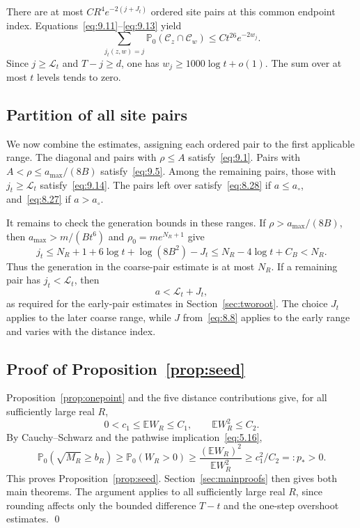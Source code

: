 \documentclass[11pt,letterpaper,reqno]{amsart}
\numberwithin{equation}{section}
\theoremstyle{remark}
\begin{document}
There are at most $CR^4e^{-2(j+J_t)}$ ordered site pairs at this common endpoint index. Equations~\eqref{eq:9.11}--\eqref{eq:9.13} yield
\begin{equation}\label{eq:9.14}
\sum_{j_t(z,w)=j}\mathbb P_0(\mathcal C_z\cap\mathcal C_w)
\le Ct^{26}e^{-2w_j}.
\end{equation}
Since $j\ge\mathcal L_t$ and $T-j\ge d$, one has
$w_j\ge1000\log t+o(1)$. The sum over at most $t$ levels tends to zero.

\subsection{Partition of all site pairs}\label{sec:partition}
We now combine the estimates, assigning each ordered pair to the first applicable range. The diagonal and pairs with $\rho\le A$ satisfy~\eqref{eq:9.1}. Pairs with $A<\rho\le a_{\max}/(8B)$ satisfy~\eqref{eq:9.5}. Among the remaining pairs, those with $j_t\ge\mathcal L_t$ satisfy~\eqref{eq:9.14}. The pairs left over satisfy~\eqref{eq:8.28} if $a\le a_\circ$, and~\eqref{eq:8.27} if $a>a_\circ$.

It remains to check the generation bounds in these ranges. If $\rho>a_{\max}/(8B)$, then $a_{\max}>m/(Bt^6)$ and $\rho_0=me^{N_R+1}$ give
\begin{equation}\label{eq:9.15}
j_t\le N_R+1+6\log t+\log(8B^2)-J_t
\le N_R-4\log t+C_B<N_R.
\end{equation}
Thus the generation in the coarse-pair estimate is at most $N_R$. If a remaining pair has $j_t<\mathcal L_t$, then
\begin{equation}\label{eq:9.16}
a<\mathcal L_t+J_t,
\end{equation}
as required for the early-pair estimates in Section~\ref{sec:tworoot}. The choice $J_t$ applies to the later coarse range, while $J$ from~\eqref{eq:8.8} applies to the early range and varies with the distance index.

\subsection{Proof of Proposition~\ref{prop:seed}}\label{sec:seedcompletion}
Proposition~\ref{prop:onepoint} and the five distance contributions give, for all sufficiently large real $R$,
\begin{equation}\label{eq:9.17}
0<c_1\le\mathbb EW_R\le C_1,\qquad
\mathbb EW_R^2\le C_2.
\end{equation}
By Cauchy--Schwarz and the pathwise implication~\eqref{eq:5.16},
\begin{equation}\label{eq:9.18}
\mathbb P_0(\sqrt{M_R}\ge b_R)
\ge\mathbb P_0(W_R>0)
\ge\frac{(\mathbb EW_R)^2}{\mathbb EW_R^2}
\ge c_1^2/C_2=:p_*>0.
\end{equation}
This proves Proposition~\ref{prop:seed}. Section~\ref{sec:mainproofs} then gives both main theorems. The argument applies to all sufficiently large real $R$, since rounding affects only the bounded difference $T-t$ and the one-step overshoot estimates.
\qed
\end{document}
